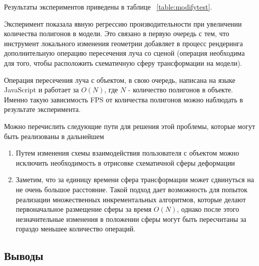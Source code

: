 \begin{table}[ht]
\begin{center}
    \caption{Зависимость FPS от количества полигонов модели при применении алгоритма ``Деформация''}
\label{table:modifytest}
\end{center}
\end{table}

Результаты экспериментов приведены в таблице ~\ref{table:modifytest}.

Эксперимент показала явную регрессию производительности при увеличении
количества полигонов в модели. Это связано в первую очередь с тем, что
инструмент локального изменения геометрии добавляет в процесс рендеринга
дополнительную операцию пересечения луча со сценой (операция необходима для
того, чтобы расположить схематичную сферу трансформации на модели).

Операция пересечения луча с объектом, в свою очередь, написана на языке
JavaScript и работает за $O(N)$, где $N$ - количество полигонов в объекте.
Именно такую зависимость FPS от количества полигонов можно наблюдать в
результате эксперимента.

Можно перечислить следующие пути для решения этой
проблемы, которые могут быть реализованы в дальнейшем
\begin{enumerate}
    \item Путем изменения схемы взаимодействия пользователя с объектом можно
    исключить необходимость в отрисовке схематичной сферы деформации
    \item Заметим, что за единицу времени сфера трансформации может сдвинуться
    на не очень большое расстояние. Такой подход дает возможность для попыток
    реализации множественных инкрементальных алгоритмов, которые делают
    первоначальное размещение сферы за время $O(N)$, однако после этого
    незначительные изменения в положении сферы могут быть пересчитаны за гораздо
    меньшее количество операций.
\end{enumerate}

\subsection{Выводы}

